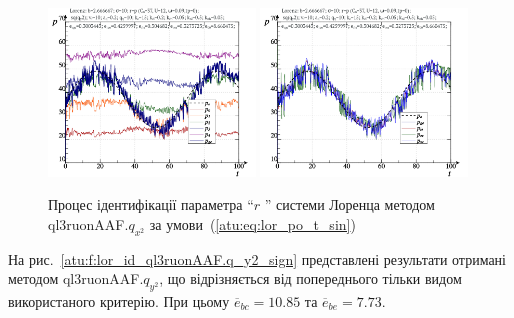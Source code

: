 \begin{figure}[ht!]
  \centerline{
    \includegraphics[width=0.49\textwidth]{p/cha/lor/ql3ruonAAF/lor_ql3ruonAAF_qy2-p_t_pi_sin.png}
    \hfill
    \includegraphics[width=0.49\textwidth]{p/cha/lor/ql3ruonAAF/lor_ql3ruonAAF_qy2-p_t_pz_sin.png}
  }
\caption{Процес ідентифікації параметра ``$ r $ '' системи Лоренца методом ql3ruonAAF.$q_{x^2} $ за умови~(\ref{atu:eq:lor_po_t_sin})}
\label{atu:f:lor_id_ql3ruonAAF.q_x2_sin}
\end{figure}


На рис.~\ref{atu:f:lor_id_ql3ruonAAF.q_y2_sign} представлені результати отримані
методом ql3ruonAAF.$q_{y^2}$, що відрізняється від попереднього тільки видом
використаного критерію. При цьому
$\overline{e}_{bc}=10.85$
та
$\overline{e}_{be}=7.73$.

